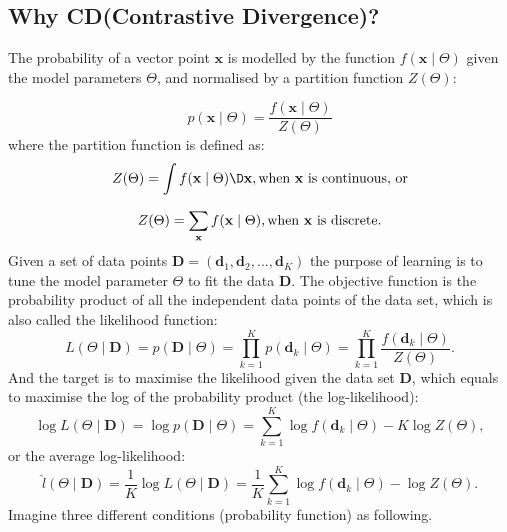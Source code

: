\subsection{Why CD(Contrastive Divergence)?\cite{hinton2002training,woodfordnotes}}
	The probability of a vector point $ \mathbf{x} $ is modelled by the function $f(\mathbf{x} \mid \Theta )$ given the model parameters $ \Theta $, and normalised by a partition function $Z( \Theta)$:
	
	\begin{equation}
	p(\mathbf{x} \mid \Theta ) = \dfrac{f(\mathbf{x} \mid \Theta )}{Z( \Theta)}
	\end{equation}
	where the partition function is defined as:
	\begin{equation}
	\label{equ:z_int}
	Z( \Theta) = \int f(\mathbf{x} \mid \Theta )\D\mathbf{x}, \text{when  $ \mathbf{x} $ is continuous, or}
	\end{equation}
	
	\begin{equation}
	\label{equ:z_dis}
	Z( \Theta) = \sum_{\mathbf{x}} f(\mathbf{x} \mid \Theta ), \text{when  $ \mathbf{x} $ is discrete.}
	\end{equation}
	Given a set of data points $ \mathbf{D}=(\mathbf{d}_1, \mathbf{d}_2, ..., \mathbf{d}_K) $ the purpose of learning is to tune the model parameter $ \Theta $ to fit the data $ \mathbf{D}  $. 
	The objective function is the probability product of all the independent data points of the data set, which is also called the likelihood function:
	\begin{equation}
	 L (\Theta \mid \mathbf{D}) = p(\mathbf{D} \mid \Theta ) = \prod_{k=1}^K p(\mathbf{d}_k \mid \Theta ) =  \prod_{k=1}^K\dfrac{f(\mathbf{d}_k \mid \Theta )}{Z( \Theta)}.
	\end{equation}
	 And the target is to maximise the likelihood given the data set $ \mathbf{D}  $, which equals to maximise the log of the probability product (the log-likelihood):
	\begin{equation}
	    \log  L (\Theta \mid \mathbf{D}) = \log p(\mathbf{D} \mid \Theta ) = \sum_{k=1}^K\log f(\mathbf{d}_k \mid \Theta ) - K \log Z( \Theta),
	\end{equation}
	or the average log-likelihood:
	\begin{equation}
	\label{equ:like}
		\hat{l} (\Theta \mid \mathbf{D}) =\frac{1}{K}\log  L (\Theta \mid \mathbf{D}) 
		=\frac{1}{K}\sum_{k=1}^K\log f(\mathbf{d}_k \mid \Theta ) - \log Z( \Theta).
	\end{equation}
	Imagine three different conditions (probability function) as following.
	
